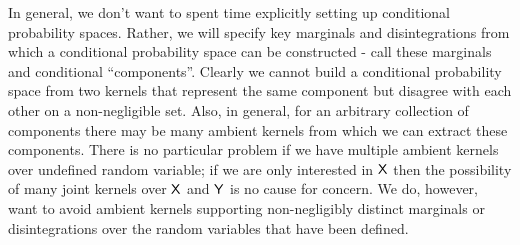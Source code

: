 In general, we don't want to spent time explicitly setting up conditional probability spaces. Rather, we will specify key marginals and disintegrations from which a conditional probability space can be constructed - call these marginals and conditional ``components''. Clearly we cannot build a conditional probability space from two kernels that represent the same component but disagree with each other on a non-negligible set. Also, in general, for an arbitrary collection of components there may be many ambient kernels from which we can extract these components. There is no particular problem if we have multiple ambient kernels over undefined random variable; if we are only interested in $\mathsf{X}$ then the possibility of many joint kernels over $\mathsf{X}$ and $\mathsf{Y}$ is no cause for concern. We do, however, want to avoid ambient kernels supporting non-negligibly distinct marginals or disintegrations over the random variables that have been defined. 

